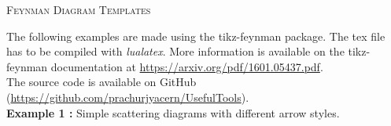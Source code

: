 \documentclass[11pt, a4paper]{article}
\begin{document}

\noindent
\begin{center}
  \textsc{\Large Feynman Diagram Templates}
\end{center}

The following examples are made using the tikz-feynman package. The tex file has to be compiled with \textit{lualatex}. More information is available on the tikz-feynman documentation at \href{https://arxiv.org/pdf/1601.05437.pdf}{https://arxiv.org/pdf/1601.05437.pdf}.\\
The source code is available on GitHub (\href{https://github.com/prachurjyacern/UsefulTools}{{https://github.com/prachurjyacern/UsefulTools}}).\\

\noindent
\textbf{Example 1 :} Simple scattering diagrams with different arrow styles.\\
\end{document}
